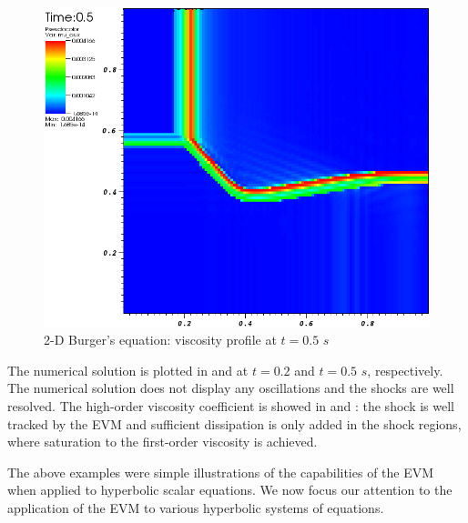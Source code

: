 %
\begin{figure}[H]
	\centering
	\includegraphics[width=\textwidth]{figures/Burger2D_visc_t0p5.png}
	\caption{2-D Burger's equation: viscosity profile at $t=0.5$ $s$}
	\label{fig:2d_burger_visc_t0p5}
\end{figure}
%
The numerical solution is plotted in  and  at $t=0.2$ and $t=0.5$ $s$, respectively. The numerical solution does not display any oscillations and the shocks are well resolved. The high-order viscosity coefficient is showed in  and : the shock is well tracked by the EVM and sufficient dissipation is only added in the shock regions, where saturation to the first-order viscosity is achieved.

The above examples were simple illustrations of the capabilities of the EVM when applied to hyperbolic scalar equations. We now focus our attention to the application of the EVM to various hyperbolic systems of equations.